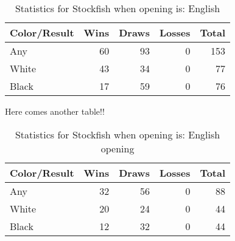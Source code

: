 \documentclass{article}
\begin{document}
\begin{table}[h!]
\centering
\begin{tabular}{l|rrrr}
Color/Result & Wins & Draws & Losses & Total\\
\hline
Any & 60 & 93 & 0 & 153\\
White & 43 & 34 & 0 & 77\\
Black & 17 & 59 & 0 & 76\\
\end{tabular}
\caption{Statistics for Stockfish when opening is: English}
\end{table}
Here comes another table!!

\begin{table}[h!]
\centering
\begin{tabular}{l|rrrr}
Color/Result & Wins & Draws & Losses & Total\\
\hline
Any & 32 & 56 & 0 & 88\\
White & 20 & 24 & 0 & 44\\
Black & 12 & 32 & 0 & 44\\
\end{tabular}
\caption{Statistics for Stockfish when opening is: English opening}
\end{table}
\end{document}
